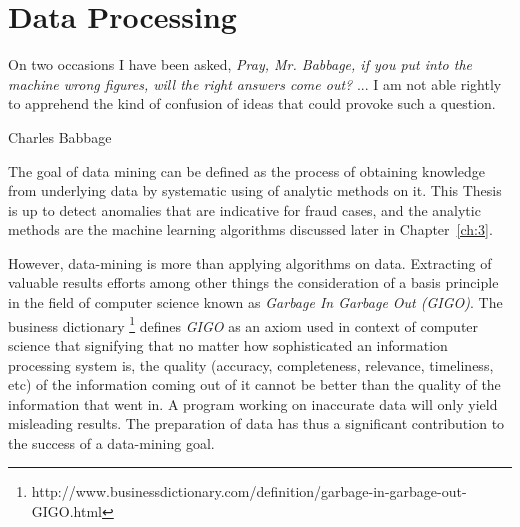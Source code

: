 \chapter{Data Processing}\label{ch:2}
\epigraph{On two occasions I have been asked, \textit{Pray, Mr. Babbage, if you put into the machine wrong figures, will the right answers come out?} ... I am not able rightly to apprehend the kind of confusion of ideas that could provoke such a question.}{Charles Babbage}

The goal of data mining can be defined as the process of obtaining knowledge from underlying data by systematic using of analytic methods on it. This Thesis is up to detect anomalies that are indicative for fraud cases, and the analytic methods are the machine learning algorithms discussed later in Chapter~\ref{ch:3}. 

However, data-mining is more than applying algorithms on data. Extracting of valuable results efforts among other things the consideration of a basis principle in the field of computer science known as \textit{Garbage In Garbage Out (GIGO)}. The business dictionary \footnote{http://www.businessdictionary.com/definition/garbage-in-garbage-out-GIGO.html}  defines \textit{GIGO} as an axiom used in context of computer science that signifying that no matter how sophisticated an information processing system is, the quality (accuracy, completeness, relevance, timeliness, etc) of the information coming out of it cannot be better than the quality of the information that went in. A program working on inaccurate data will only yield misleading results. The preparation of data has thus a significant contribution to the success of a data-mining goal.

